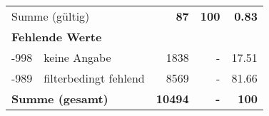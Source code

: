 \begin{longtable}{lXrrr}
     \midrule
     \multicolumn{2}{l}{Summe (gültig)} &
       \textbf{\num{87}} &
     \textbf{100} &
       \textbf{\num[round-mode=places,round-precision=2]{0,83}} \\
     \multicolumn{5}{l}{\textbf{Fehlende Werte}}\\
       -998 &
       keine Angabe &
         \num{1838} &
        - &
         \num[round-mode=places,round-precision=2]{17,51} \\
       -989 &
       filterbedingt fehlend &
         \num{8569} &
        - &
         \num[round-mode=places,round-precision=2]{81,66} \\
     \midrule
     \multicolumn{2}{l}{\textbf{Summe (gesamt)}} &
          \textbf{\num{10494}} &
        \textbf{-} &
        \textbf{100} \\
     \bottomrule
     \end{longtable}
     
